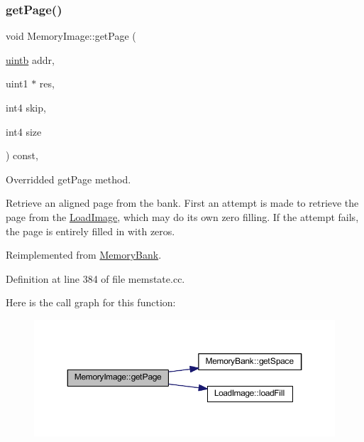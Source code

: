 \subsubsection{\texorpdfstring{getPage()}{getPage()}}
{\footnotesize\ttfamily void Memory\+Image\+::get\+Page (\begin{DoxyParamCaption}\item[{\mbox{\hyperlink{types_8h_a2db313c5d32a12b01d26ac9b3bca178f}{uintb}}}]{addr,  }\item[{uint1 $\ast$}]{res,  }\item[{int4}]{skip,  }\item[{int4}]{size }\end{DoxyParamCaption}) const\hspace{0.3cm}{\ttfamily [protected]}, {\ttfamily [virtual]}}



Overridded get\+Page method. 

Retrieve an aligned page from the bank. First an attempt is made to retrieve the page from the \mbox{\hyperlink{class_load_image}{Load\+Image}}, which may do its own zero filling. If the attempt fails, the page is entirely filled in with zeros. 

Reimplemented from \mbox{\hyperlink{class_memory_bank_ac48e5c77befa62116190b34611ad4339}{Memory\+Bank}}.



Definition at line 384 of file memstate.\+cc.

Here is the call graph for this function\+:
\nopagebreak
\begin{figure}[H]
\begin{center}
\leavevmode
\includegraphics[width=350pt]{class_memory_image_abcf3229adb6b824702b627d1de5a9f10_cgraph}
\end{center}
\end{figure}
\mbox{\label{class_memory_image_a8bf36a4938f306fedbd4d409406cc102}} 
